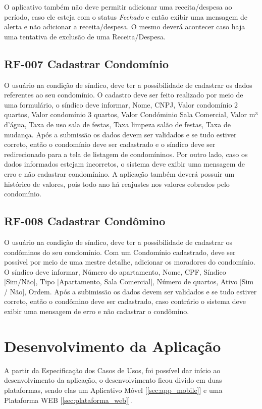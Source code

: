 \documentclass[12pt]{article}
\begin{document}
O aplicativo também não deve permitir adicionar uma receita/despesa ao período, caso ele esteja com o status \emph{Fechado} e então exibir uma mensagem de alerta e não adicionar a receita/despesa. O mesmo deverá acontecer caso haja uma tentativa de exclusão de uma Receita/Despesa.

\subsection{RF-007 Cadastrar Condomínio}
O usuário na condição de síndico, deve ter a possibilidade de cadastrar os dados referentes ao seu condomínio. O cadastro deve ser feito realizado por meio de uma formulário, o síndico deve informar, Nome, CNPJ, Valor condomínio 2 quartos, Valor condomínio 3 quartos, Valor Condóminio Sala Comercial, Valor m³ d'água, Taxa de uso sala de festas, Taxa limpeza salão de festas, Taxa de mudança. Após a submissão os dados devem ser validados e se tudo estiver correto, então o condomínio deve ser cadastrado e o síndico deve ser redirecionado para a tela de listagem de condomíninos. Por outro lado, caso os dados informados estejam incorretos, o sistema deve exibir uma mensagem de erro e não cadastrar condomínino. 
A aplicação também deverá possuir um histórico de valores, pois todo ano há reajustes nos valores cobrados pelo condomínio.

\subsection{RF-008 Cadastrar Condômino}
O usuário na condição de síndico, deve ter a possibilidade de cadastrar os condôminos do seu condomínio. Com um Condomínio cadastrado, deve ser possível por meio de uma mestre detalhe, adicionar os moradores do condomínio. O síndico deve informar, Número do apartamento, Nome, CPF, Síndico [Sim/Não], Tipo [Apartamento, Sala Comercial], Número de quartos, Ativo [Sim / Não], Ordem. Após a subimissão os dados devem ser validados e se tudo estiver correto, então o condômino deve ser cadastrado, caso contrário o sistema deve exibir uma mensagem de erro e não cadastrar o condômino.

\section{Desenvolvimento da Aplicação}
A partir da Especificação dos Casos de Usos, foi possível dar início ao desenvolvimento da aplicação, o desenvolvimento ficou divido em duas plataformas, sendo elas um Aplicativo Móvel [\ref{sec:app_mobile}] e uma Plataforma WEB [\ref{sec:plataforma_web}].
\end{document}
